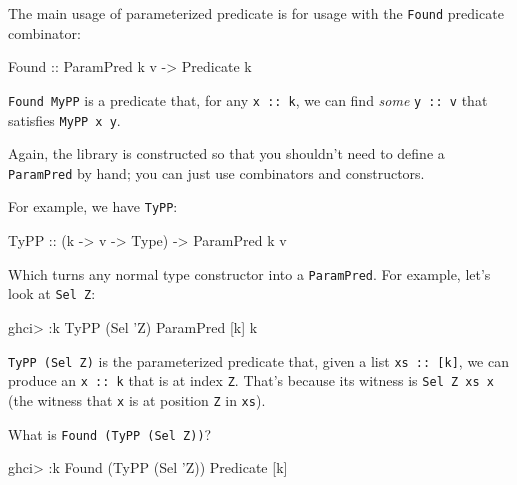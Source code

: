 \documentclass[]{article}
\newenvironment{Shaded}{}{}
\newcommand{\DataTypeTok}[1]{\textcolor[rgb]{0.56,0.13,0.00}{#1}}
\newcommand{\FunctionTok}[1]{\textcolor[rgb]{0.02,0.16,0.49}{#1}}
\newcommand{\NormalTok}[1]{#1}
\newcommand{\OtherTok}[1]{\textcolor[rgb]{0.00,0.44,0.13}{#1}}
\begin{document}
The main usage of parameterized predicate is for usage with the \texttt{Found}
predicate combinator:

\begin{Shaded}
\begin{Highlighting}[]
\DataTypeTok{Found}\OtherTok{ ::} \DataTypeTok{ParamPred}\NormalTok{ k v }\OtherTok{->} \DataTypeTok{Predicate}\NormalTok{ k}
\end{Highlighting}
\end{Shaded}

\texttt{Found\ MyPP} is a predicate that, for any \texttt{x\ ::\ k}, we can find
\emph{some} \texttt{y\ ::\ v} that satisfies \texttt{MyPP\ x\ y}.

Again, the library is constructed so that you shouldn't need to define a
\texttt{ParamPred} by hand; you can just use combinators and constructors.

For example, we have \texttt{TyPP}:

\begin{Shaded}
\begin{Highlighting}[]
\DataTypeTok{TyPP}\OtherTok{ ::}\NormalTok{ (k }\OtherTok{->}\NormalTok{ v }\OtherTok{->} \DataTypeTok{Type}\NormalTok{) }\OtherTok{->} \DataTypeTok{ParamPred}\NormalTok{ k v}
\end{Highlighting}
\end{Shaded}

Which turns any normal type constructor into a \texttt{ParamPred}. For example,
let's look at \texttt{Sel\ \textquotesingle{}Z}:

\begin{Shaded}
\begin{Highlighting}[]
\NormalTok{ghci}\FunctionTok{>} \FunctionTok{:}\NormalTok{k }\DataTypeTok{TyPP}\NormalTok{ (}\DataTypeTok{Sel}\NormalTok{ '}\DataTypeTok{Z}\NormalTok{)}
\DataTypeTok{ParamPred}\NormalTok{ [k] k}
\end{Highlighting}
\end{Shaded}

\texttt{TyPP\ (Sel\ \textquotesingle{}Z)} is the parameterized predicate that,
given a list \texttt{xs\ ::\ {[}k{]}}, we can produce an \texttt{x\ ::\ k} that
is at index \texttt{\textquotesingle{}Z}. That's because its witness is
\texttt{Sel\ \textquotesingle{}Z\ xs\ x} (the witness that \texttt{x} is at
position \texttt{\textquotesingle{}Z} in \texttt{xs}).

What is \texttt{Found\ (TyPP\ (Sel\ \textquotesingle{}Z))}?

\begin{Shaded}
\begin{Highlighting}[]
\NormalTok{ghci}\FunctionTok{>} \FunctionTok{:}\NormalTok{k }\DataTypeTok{Found}\NormalTok{ (}\DataTypeTok{TyPP}\NormalTok{ (}\DataTypeTok{Sel}\NormalTok{ '}\DataTypeTok{Z}\NormalTok{))}
\DataTypeTok{Predicate}\NormalTok{ [k]}
\end{Highlighting}
\end{Shaded}
\end{document}
